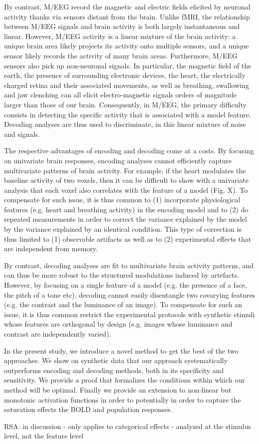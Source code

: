 By contrast, M/EEG record the magnetic and electric fields elicited by neuronal activity thanks via sensors distant from the brain. Unlike fMRI, the relationship between M/EEG signals and brain activity is both largely instantaneous and linear. However, M/EEG activity is a linear mixture of the brain activity: a unique brain area likely projects its activity onto multiple sensors, and a unique sensor likely records the activity of many brain areas. Furthermore, M/EEG sensors also pick up non-neuronal signals. In particular, the magnetic field of the earth, the presence of surrounding electronic devices, the heart, the electrically charged retina and their associated movements, as well as breathing, swallowing and jaw clenching can all elicit electro-magnetic signals orders of magnitude larger than those of our brain. Consequently, in M/EEG, the primary difficulty consists in detecting the specific activity that is associated with a model feature. Decoding analyses are thus used to discriminate, in this linear mixture of noise and signals.

The respective advantages of encoding and decoding come at a costs. By focusing on univariate brain responses, encoding analyses cannot efficiently capture multivariate patterns of brain activity. For example, if the heart modulates the baseline activity of two voxels, then it can be difficult to show with a univariate analysis that each voxel also correlates with the feature of a model (Fig. X). To compensate for such issue, it is thus common to (1) incorporate physiological features (e.g. heart and breathing activity) in the encoding model and to (2) do repeated measurements in order to correct the variance explained by the model by the variance explained by an identical condition. This type of correction is thus limited to (1) observable artifacts as well as to (2) experimental effects that are independent from memory.

By contrast, decoding analyses are fit to multivariate brain activity patterns, and can thus be more robust to the structured modulations induced by artefacts. However, by focusing on a single feature of a model (e.g. the presence of a face, the pitch of a tone etc), decoding cannot easily disentangle two covarying features (e.g. the contrast and the luminance of an image). To compensate for such an issue, it is thus common restrict the experimental protocols with synthetic stimuli whose features are orthogonal by design (e.g. images whose luminance and contrast are independently varied).

In the present study, we introduce a novel method to get the best of the two approaches. We show on synthetic data that our approach systematically outperforms encoding and decoding methods, both in its specificity and sensitivity. We provide a proof that formalizes the conditions within which our method will be optimal. Finally we provide an extension to non-linear but monotonic activation functions in order to potentially in order to capture the saturation effects the BOLD and population responses.

RSA: in discussion
- only applies to categorical effects
- analyzed at the stimulus level, not the feature level
